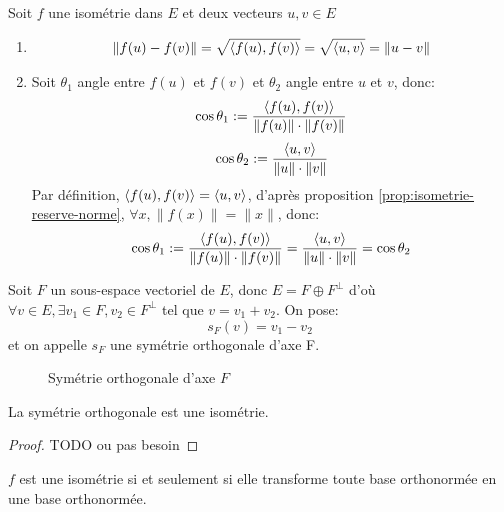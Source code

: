 \begin{preuve}
   Soit $f$ une isométrie dans  $E$ et deux vecteurs  $u, v \in E$ 
   \begin{enumerate}
       \item  
           \begin{align*}
               \|f(u) - f(v)\| = \sqrt{\left\langle f(u), f(v) \right\rangle} = \sqrt{\left\langle u, v \right\rangle} = \|u - v\| 
           \end{align*}
       \item Soit $\theta_1$ angle entre  $f(u)$ et  $f(v)$ et $\theta_2$ angle entre  $u$ et  $v$, donc:
            \[
                \cos \theta_1 := \frac{\left\langle f(u), f(v) \right\rangle}{\|f(u)\| \cdot \|f(v)\|}
           \] 
           \[
                \cos \theta_2 := \frac{\left\langle u, v \right\rangle}{\|u\| \cdot \|v\|}
           \] 
           Par définition, $\left\langle f(u), f(v) \right\rangle = \left\langle u, v \right\rangle$, d'après proposition \ref{prop:isometrie-reserve-norme},  $\forall x, \|f(x)\| = \|x\|$, donc:
           \[
                \cos \theta_1 := \frac{\left\langle f(u), f(v) \right\rangle}{\|f(u)\| \cdot \|f(v)\|} = \frac{\left\langle u, v \right\rangle}{\|u\| \cdot \|v\|} = \cos \theta_2
           \] 
   \end{enumerate}
\end{preuve}
\begin{definition}
    Soit $F$ un sous-espace vectoriel de  $E$, donc  $E = F \oplus F^{\perp}$ d'où  $\forall v \in E, \exists v_1 \in F, v_2 \in F^{\perp}$ tel que $v = v_1 + v_2$. On pose:
    \[
    s_F(v) = v_1 - v_2
    \] 
    et on appelle $s_F$ une symétrie orthogonale d'axe F.
\end{definition}
\begin{figure}[H]
    \centering
    \caption{Symétrie orthogonale d'axe $F$}
    \label{fig:symetrie-orthogonale-axe-f}
\end{figure}
\begin{prop}
   La symétrie orthogonale est une isométrie. 
\end{prop}
\begin{proof}
   TODO ou pas besoin 
\end{proof}
\begin{prop}\label{prop:isometrie-ssi-transforme-bon-en-bon}
   $f$ est une isométrie si et seulement si elle transforme toute base orthonormée en une base orthonormée. 
\end{prop}
